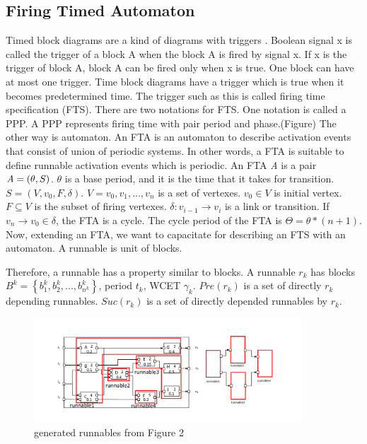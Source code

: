 \documentclass[conference,compsoc]{IEEEtran}
\begin{document}
\subsection{Firing Timed Automaton}
 Timed block diagrams are a kind of diagrams with triggers \cite{Lublinerman:2009:MCG:1480881.1480893}.
Boolean signal x is called the trigger of a block A when the block A is fired by signal x. 
If x is the trigger of block A, block A can be fired only when x is true.
One block can have at most one trigger.
Time block diagrams have a trigger which is true when it becomes predetermined time.
The trigger such as this is called firing time specification (FTS).
There are two notations for FTS.
One notation is called a PPP.
A PPP represents firing time with pair period and phase.(Figure)
The other way is  automaton.
An FTA is an automaton to describe activation events that consist of union of periodic systems.
In other words, a FTA is suitable to define runnable activation events which is periodic.
 An FTA {\it A} is a pair ${\it A} = (\theta,S)$. $\theta$ is a base period, and it is  the time that it takes for transition. 
$S = (V,v_0,F,\delta)$.
$V = {v_0,v_1,...,v_n}$ is a set of vertexes.
$v_0 \in V$ is initial vertex.
$F \subseteq V$ is the subset of firing vertexes.
$\delta : v_{i-1} \rightarrow v_{i}$ is a link or transition.
If $v_n \rightarrow v_0 \in \delta$, the FTA is a cycle.
The cycle period of the FTA is $\Theta = \theta * (n+1)$.
Now, extending an FTA, we want to capacitate for describing an FTS with an automaton.
A runnable is unit of blocks.

Therefore, a runnable has a property similar to blocks.
A runnable $r_k$ has blocks $B^k = \left\{b_1^k,b_2^k,...,b_{n^k}^k\right\}$, period $t_k$, WCET $\gamma_k$.
$Pre(r_k)$ is a set of directly $r_k$ depending runnables.
$Suc(r_k)$ is a set of directly depended runnables by $r_k$.

\begin{figure}
	\centering
	\includegraphics[width=10cm,clip]{figure7.pdf}
	\caption{generated runnables from Figure 2}
	\label{fig3}
\end{figure}
\end{document}
